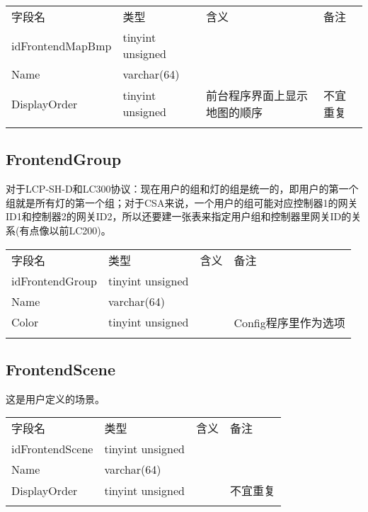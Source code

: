\begin{longtabu}[c]{@{}lXXX@{}}
\toprule\addlinespace
字段名 & 类型 & 含义 & 备注
\\\addlinespace
\midrule\endhead
idFrontendMapBmp & tinyint unsigned & &
\\\addlinespace
Name & varchar(64) & &
\\\addlinespace
DisplayOrder & tinyint unsigned & 前台程序界面上显示地图的顺序 &
不宜重复
\\\addlinespace
\bottomrule
\end{longtabu}

\subsection{FrontendGroup}\label{frontendgroup}

对于LCP-SH-D和LC300协议：现在用户的组和灯的组是统一的，即用户的第一个组就是所有灯的第一个组；对于CSA来说，一个用户的组可能对应控制器1的网关ID1和控制器2的网关ID2，所以还要建一张表来指定用户组和控制器里网关ID的关系(有点像以前LC200)。

\begin{longtabu}[c]{@{}lXXX@{}}
\toprule\addlinespace
字段名 & 类型 & 含义 & 备注
\\\addlinespace
\midrule\endhead
idFrontendGroup & tinyint unsigned & &
\\\addlinespace
Name & varchar(64) & &
\\\addlinespace
Color & tinyint unsigned & & Config程序里作为选项
\\\addlinespace
\bottomrule
\end{longtabu}

\subsection{FrontendScene}\label{frontendscene}

这是用户定义的场景。

\begin{longtabu}[c]{@{}lXXX@{}}
\toprule\addlinespace
字段名 & 类型 & 含义 & 备注
\\\addlinespace
\midrule\endhead
idFrontendScene & tinyint unsigned & &
\\\addlinespace
Name & varchar(64) & &
\\\addlinespace
DisplayOrder & tinyint unsigned & & 不宜重复
\\\addlinespace
\bottomrule
\end{longtabu}

